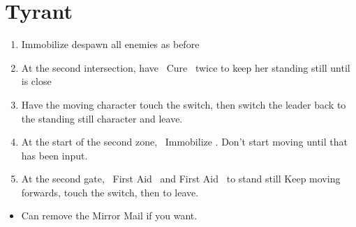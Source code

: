 \chapter{Tyrant}
\begin{enumerate}
	\penelof Dispell and Immobilize on \penelo
	\item Immobilize despawn all enemies as before
	\item At the second intersection, have \ashe\ Cure \vaan\ twice to keep her standing still until  is close
	\item Have the moving character touch the switch, then switch the leader back to the standing still character and leave.
	\item At the start of the second zone, \penelo\ Immobilize \penelo. Don't start moving until that has been input.
	\item At the second gate, \balthier\ First Aid \balthier\ and First Aid \ashe\ to stand still
	      \ashef Keep moving forwards, touch the switch, then \leader{\ashe} to leave.
\end{enumerate}
\begin{menu}
	\party{\vaan, \ashe, \penelo}
	\begin{itemize}
		\item Can remove the Mirror Mail if you want.
	\end{itemize}
\end{menu}
\begin{liscense}
	\begin{itemize}
	\end{itemize}
\end{liscense}
